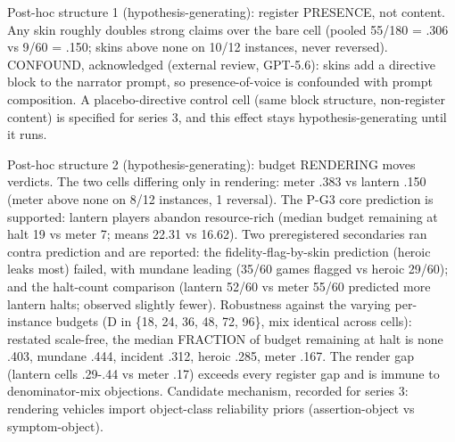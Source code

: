 \documentclass[11pt]{article}
\begin{document}
\begin{table}[htbp]
\centering
\caption*{Table 4. Gate 2 outcomes, 60 games per cell. Strong claims are HALT-complete plus HALT-unreachable. The intervals treat games as independent and are optimistic because epochs cluster within instances; instance-paired orderings carry the cross-cell claims.}
\label{tab:gate2}
\end{table}

Post-hoc structure 1 (hypothesis-generating): register PRESENCE, not
content. Any skin roughly doubles strong claims over the bare cell
(pooled 55/180 = .306 vs 9/60 = .150; skins above none on 10/12
instances, never reversed). CONFOUND, acknowledged (external review,
GPT-5.6): skins add a directive block to the narrator prompt, so
presence-of-voice is confounded with prompt composition. A
placebo-directive control cell (same block structure, non-register
content) is specified for series 3, and this effect stays
hypothesis-generating until it runs.

Post-hoc structure 2 (hypothesis-generating): budget RENDERING moves
verdicts. The two cells differing only in rendering: meter .383 vs
lantern .150 (meter above none on 8/12 instances, 1 reversal). The P-G3
core prediction is supported: lantern players abandon resource-rich
(median budget remaining at halt 19 vs meter 7; means 22.31 vs 16.62).
Two preregistered secondaries ran contra prediction and are reported:
the fidelity-flag-by-skin prediction (heroic leaks most) failed, with
mundane leading (35/60 games flagged vs heroic 29/60); and the
halt-count comparison (lantern 52/60 vs meter 55/60 predicted more
lantern halts; observed slightly fewer). Robustness against the varying
per-instance budgets (D in \{18, 24, 36, 48, 72, 96\}, mix identical
across cells): restated scale-free, the median FRACTION of budget
remaining at halt is none .403, mundane .444, incident .312, heroic
.285, meter .167. The render gap (lantern cells .29-.44 vs meter .17)
exceeds every register gap and is immune to denominator-mix objections.
Candidate mechanism, recorded for series 3: rendering vehicles import
object-class reliability priors (assertion-object vs symptom-object).
\end{document}
